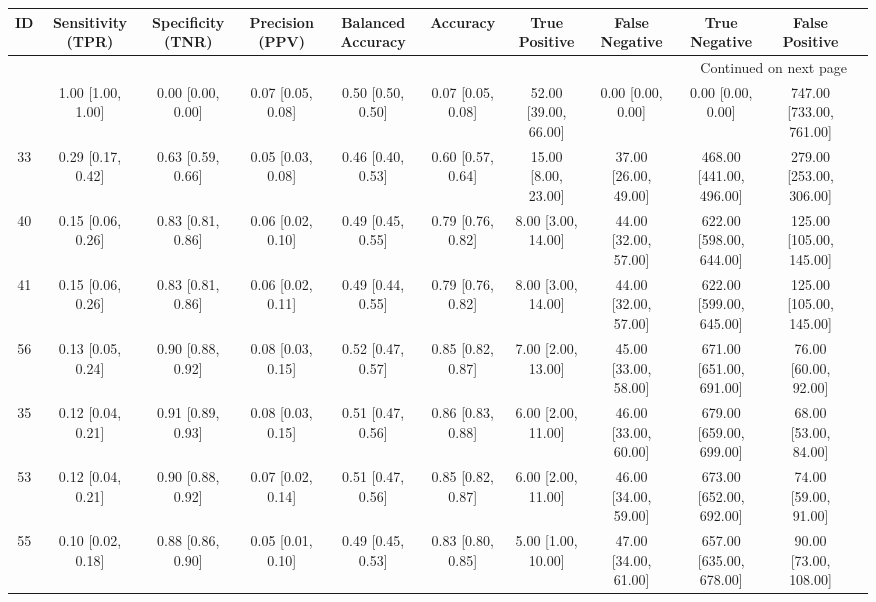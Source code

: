 \documentclass[8pt]{article}
\begin{document}
\begin{center}
\begin{footnotesize}
\begin{longtable}{|ccccccccccc|}
\toprule
 ID &  Sensitivity (TPR) &  Specificity (TNR) &    Precision (PPV) &  Balanced Accuracy &           Accuracy &         True Positive &        False Negative &            True Negative &           False Positive \\
\midrule
\endhead
\midrule
\multicolumn{10}{r}{{Continued on next page}} \\
\midrule
\endfoot

\bottomrule
\endlastfoot
 42 &  1.00 [1.00, 1.00] &  0.00 [0.00, 0.00] &  0.07 [0.05, 0.08] &  0.50 [0.50, 0.50] &  0.07 [0.05, 0.08] &  52.00 [39.00, 66.00] &     0.00 [0.00, 0.00] &        0.00 [0.00, 0.00] &  747.00 [733.00, 761.00] \\
 33 &  0.29 [0.17, 0.42] &  0.63 [0.59, 0.66] &  0.05 [0.03, 0.08] &  0.46 [0.40, 0.53] &  0.60 [0.57, 0.64] &   15.00 [8.00, 23.00] &  37.00 [26.00, 49.00] &  468.00 [441.00, 496.00] &  279.00 [253.00, 306.00] \\
 40 &  0.15 [0.06, 0.26] &  0.83 [0.81, 0.86] &  0.06 [0.02, 0.10] &  0.49 [0.45, 0.55] &  0.79 [0.76, 0.82] &    8.00 [3.00, 14.00] &  44.00 [32.00, 57.00] &  622.00 [598.00, 644.00] &  125.00 [105.00, 145.00] \\
 41 &  0.15 [0.06, 0.26] &  0.83 [0.81, 0.86] &  0.06 [0.02, 0.11] &  0.49 [0.44, 0.55] &  0.79 [0.76, 0.82] &    8.00 [3.00, 14.00] &  44.00 [32.00, 57.00] &  622.00 [599.00, 645.00] &  125.00 [105.00, 145.00] \\
 56 &  0.13 [0.05, 0.24] &  0.90 [0.88, 0.92] &  0.08 [0.03, 0.15] &  0.52 [0.47, 0.57] &  0.85 [0.82, 0.87] &    7.00 [2.00, 13.00] &  45.00 [33.00, 58.00] &  671.00 [651.00, 691.00] &     76.00 [60.00, 92.00] \\
 35 &  0.12 [0.04, 0.21] &  0.91 [0.89, 0.93] &  0.08 [0.03, 0.15] &  0.51 [0.47, 0.56] &  0.86 [0.83, 0.88] &    6.00 [2.00, 11.00] &  46.00 [33.00, 60.00] &  679.00 [659.00, 699.00] &     68.00 [53.00, 84.00] \\
 53 &  0.12 [0.04, 0.21] &  0.90 [0.88, 0.92] &  0.07 [0.02, 0.14] &  0.51 [0.47, 0.56] &  0.85 [0.82, 0.87] &    6.00 [2.00, 11.00] &  46.00 [34.00, 59.00] &  673.00 [652.00, 692.00] &     74.00 [59.00, 91.00] \\
 55 &  0.10 [0.02, 0.18] &  0.88 [0.86, 0.90] &  0.05 [0.01, 0.10] &  0.49 [0.45, 0.53] &  0.83 [0.80, 0.85] &    5.00 [1.00, 10.00] &  47.00 [34.00, 61.00] &  657.00 [635.00, 678.00] &    90.00 [73.00, 108.00] \\

\end{longtable}
\end{footnotesize}
\end{center}
\end{document}
